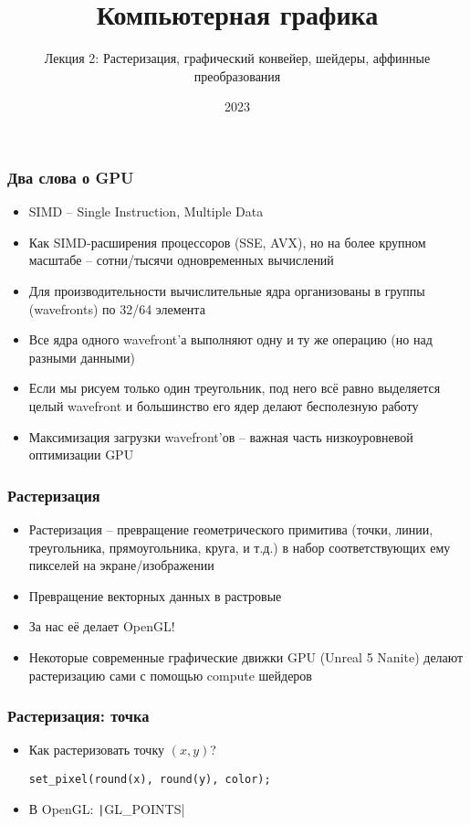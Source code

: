 \documentclass[10pt]{beamer}
\title{Компьютерная графика}
\subtitle{Лекция 2: Растеризация, графический конвейер, шейдеры, аффинные преобразования}
\date{2023}
\begin{document}
\frame{\titlepage}

\begin{frame}
\frametitle{Два слова о GPU}
\pause
\begin{itemize}
\item SIMD -- Single Instruction, Multiple Data
\pause
\item Как SIMD-расширения процессоров (SSE, AVX), но на более крупном масштабе -- сотни/тысячи одновременных вычислений
\pause
\item Для производительности вычислительные ядра организованы в группы (wavefronts) по 32/64 элемента
\pause
\item Все ядра одного wavefront'а выполняют одну и ту же операцию (но над разными данными)
\pause
\item Если мы рисуем только один треугольник, под него всё равно выделяется целый wavefront и большинство его ядер делают бесполезную работу
\pause
\item Максимизация загрузки wavefront'ов -- важная часть низкоуровневой оптимизации GPU
\end{itemize}
\end{frame}

\begin{frame}
\frametitle{Растеризация}
\begin{itemize}
\item Растеризация -- превращение геометрического примитива (точки, линии, треугольника, прямоугольника, круга, и т.д.) в набор соответствующих ему пикселей на экране/изображении
\item Превращение векторных данных в растровые
\pause
\item За нас её делает OpenGL!
\pause
\item Некоторые современные графические движки GPU (Unreal 5 Nanite) делают растеризацию сами с помощью compute шейдеров
\end{itemize}
\end{frame}

\begin{frame}[fragile]
\frametitle{Растеризация: точка}
\begin{itemize}
\item Как растеризовать точку \begin{math}(x, y)\end{math}?
\pause
{}
\begin{verbatim}
set_pixel(round(x), round(y), color);
\end{verbatim}
\pause
{}
\item В OpenGL: \texttt|GL_POINTS|
\end{itemize}
\end{frame}
\end{document}
